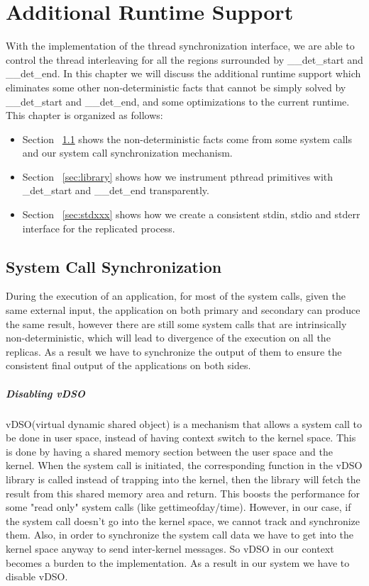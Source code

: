 \chapter{Additional Runtime Support}
With the implementation of the thread synchronization interface, we are able to control the thread interleaving for all the regions surrounded by \_\_det\_start and \_\_det\_end. In this chapter we will discuss the additional runtime support which eliminates some other non-deterministic facts that cannot be simply solved by \_\_det\_start and \_\_det\_end, and some optimizations to the current runtime. This chapter is organized as follows:

\begin{itemize}
  \item Section ~\ref{sec:syscall} shows the non-deterministic facts come from some system calls and our system call synchronization mechanism.
  \item Section ~\ref{sec:library} shows how we instrument pthread primitives with \_det\_start and \_\_det\_end transparently.
  \item Section ~\ref{sec:stdxxx} shows how we create a consistent stdin, stdio and stderr interface for the replicated process.
\end{itemize}

\section{System Call Synchronization} \label{sec:syscall}
During the execution of an application, for most of the system calls, given the same external input, the application on both primary and secondary can produce the same result, however there are still some system calls that are intrinsically non-deterministic, which will lead to divergence of the execution on all the replicas. As a result we have to synchronize the output of them to ensure the consistent final output of the applications on both sides.

\paragraph{Disabling vDSO}

vDSO(virtual dynamic shared object) is a mechanism that allows a system call to be done in user space, instead of having context switch to the kernel space. This is done by having a shared memory section between the user space and the kernel. When the system call is initiated, the corresponding function in the vDSO library is called instead of trapping into the kernel, then the library will fetch the result from this shared memory area and return. This boosts the performance for some "read only" system calls (like gettimeofday/time). However, in our case, if the system call doesn't go into the kernel space, we cannot track and synchronize them. Also, in order to synchronize the system call data we have to get into the kernel space anyway to send inter-kernel messages. So vDSO in our context becomes a burden to the implementation. As a result in our system we have to disable vDSO.

